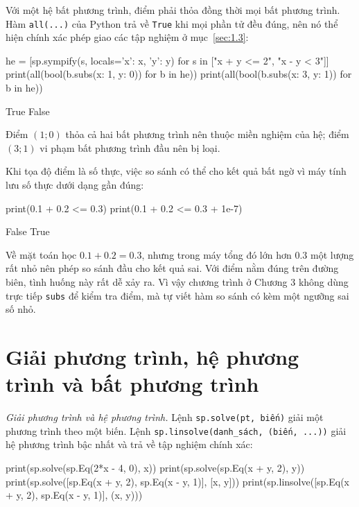 \documentclass[12pt,a4paper]{report}
\begin{document}
Với một hệ bất phương trình, điểm phải thỏa đồng thời mọi bất phương trình. Hàm \texttt{all(...)} của Python trả về \texttt{True} khi mọi phần tử đều đúng, nên nó thể hiện chính xác phép giao các tập nghiệm ở mục~\ref*{sec:1.3}:

\begin{madoanbox}
he = [sp.sympify(s, locals={'x': x, 'y': y})
      for s in ["x + y <= 2", "x - y < 3"]]
print(all(bool(b.subs({x: 1, y: 0})) for b in he))
print(all(bool(b.subs({x: 3, y: 1})) for b in he))
\end{madoanbox}

\begin{ketquabox}
True
False
\end{ketquabox}

Điểm $(1;0)$ thỏa cả hai bất phương trình nên thuộc miền nghiệm của hệ; điểm $(3;1)$ vi phạm bất phương trình đầu nên bị loại.

\begin{notebox}
Khi tọa độ điểm là số thực, việc so sánh có thể cho kết quả bất ngờ vì máy tính lưu số thực dưới dạng gần đúng:

\begin{madoanbox}
print(0.1 + 0.2 <= 0.3)
print(0.1 + 0.2 <= 0.3 + 1e-7)
\end{madoanbox}

\begin{ketquabox}
False
True
\end{ketquabox}

Về mặt toán học $0.1+0.2=0.3$, nhưng trong máy tổng đó lớn hơn $0.3$ một lượng rất nhỏ nên phép so sánh đầu cho kết quả sai. Với điểm nằm đúng trên đường biên, tình huống này rất dễ xảy ra. Vì vậy chương trình ở Chương 3 không dùng trực tiếp \texttt{subs} để kiểm tra điểm, mà tự viết hàm so sánh có kèm một ngưỡng sai số nhỏ.
\end{notebox}

\section{Giải phương trình, hệ phương trình và bất phương trình}
\label{sec:2.9}

\textit{Giải phương trình và hệ phương trình.} Lệnh \texttt{sp.solve(pt, biến)} giải một phương trình theo một biến. Lệnh \texttt{sp.linsolve(danh\_sách, (biến, ...))} giải hệ phương trình bậc nhất và trả về tập nghiệm chính xác:

\begin{madoanbox}
print(sp.solve(sp.Eq(2*x - 4, 0), x))
print(sp.solve(sp.Eq(x + y, 2), y))
print(sp.solve([sp.Eq(x + y, 2), sp.Eq(x - y, 1)], [x, y]))
print(sp.linsolve([sp.Eq(x + y, 2), sp.Eq(x - y, 1)], (x, y)))
\end{madoanbox}
\end{document}
